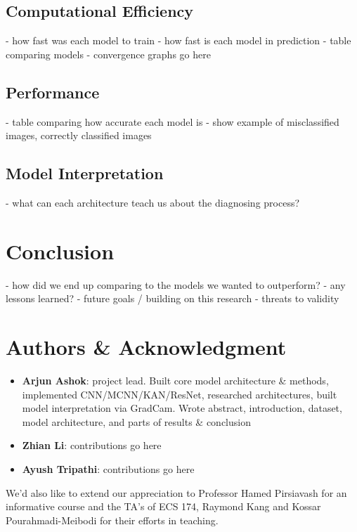 \documentclass[conference]{IEEEtran}
\begin{document}
\subsection{Computational Efficiency}
- how fast was each model to train
- how fast is each model in prediction
- table comparing models
- convergence graphs go here

\subsection{Performance}
- table comparing how accurate each model is
- show example of misclassified images, correctly classified images

\subsection{Model Interpretation}
- what can each architecture teach us about the diagnosing process?


\section{Conclusion}
- how did we end up comparing to the models we wanted to outperform?
- any lessons learned?
- future goals / building on this research
- threats to validity


\section{Authors \& Acknowledgment}
\begin{itemize}
    \item \textbf{Arjun Ashok}: project lead. Built core model architecture \& methods, implemented CNN/MCNN/KAN/ResNet, researched architectures, built model interpretation via GradCam. Wrote abstract, introduction, dataset, model architecture, and parts of results \& conclusion
    \item \textbf{Zhian Li}: contributions go here
    \item \textbf{Ayush Tripathi}: contributions go here
\end{itemize}

We'd also like to extend our appreciation to Professor Hamed Pirsiavash for an informative course and the TA's of ECS 174, Raymond Kang and Kossar Pourahmadi-Meibodi for their efforts in teaching.


\appendix
\end{document}
